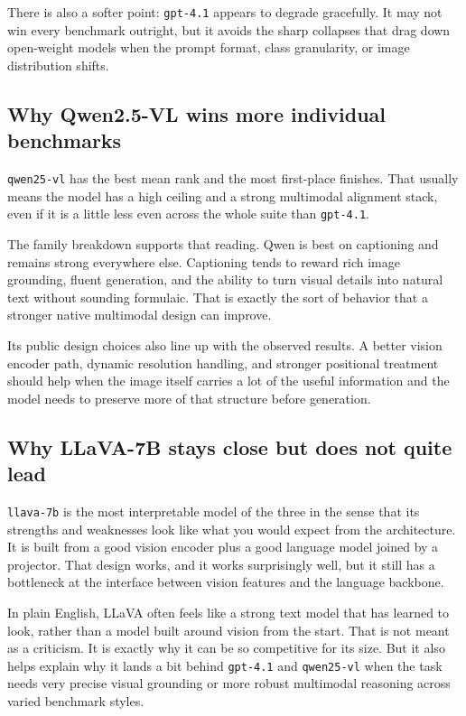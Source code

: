 \documentclass[11pt]{article}
\begin{document}
There is also a softer point: \texttt{gpt-4.1} appears to degrade gracefully. It may not win every benchmark outright, but it avoids the sharp collapses that drag down open-weight models when the prompt format, class granularity, or image distribution shifts.

\subsection{Why Qwen2.5-VL wins more individual benchmarks}
\texttt{qwen25-vl} has the best mean rank and the most first-place finishes. That usually means the model has a high ceiling and a strong multimodal alignment stack, even if it is a little less even across the whole suite than \texttt{gpt-4.1}.

The family breakdown supports that reading. Qwen is best on captioning and remains strong everywhere else. Captioning tends to reward rich image grounding, fluent generation, and the ability to turn visual details into natural text without sounding formulaic. That is exactly the sort of behavior that a stronger native multimodal design can improve.

Its public design choices also line up with the observed results. A better vision encoder path, dynamic resolution handling, and stronger positional treatment should help when the image itself carries a lot of the useful information and the model needs to preserve more of that structure before generation.

\subsection{Why LLaVA-7B stays close but does not quite lead}
\texttt{llava-7b} is the most interpretable model of the three in the sense that its strengths and weaknesses look like what you would expect from the architecture. It is built from a good vision encoder plus a good language model joined by a projector. That design works, and it works surprisingly well, but it still has a bottleneck at the interface between vision features and the language backbone.

In plain English, LLaVA often feels like a strong text model that has learned to look, rather than a model built around vision from the start. That is not meant as a criticism. It is exactly why it can be so competitive for its size. But it also helps explain why it lands a bit behind \texttt{gpt-4.1} and \texttt{qwen25-vl} when the task needs very precise visual grounding or more robust multimodal reasoning across varied benchmark styles.
\end{document}
